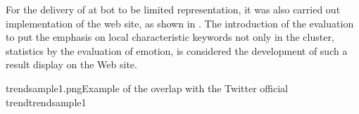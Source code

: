 For the delivery of at bot to be limited representation, it was also carried out implementation of the web site, as shown in  \cite{trend_elzup_com}.
The introduction of the evaluation to put the emphasis on local characteristic keywords not only in the cluster, statistics by the evaluation of emotion, is considered the development of such a result display on the Web site.


{trendsample1.png}{Example of the overlap with the Twitter official trend}{trendsample1}


\newpage
